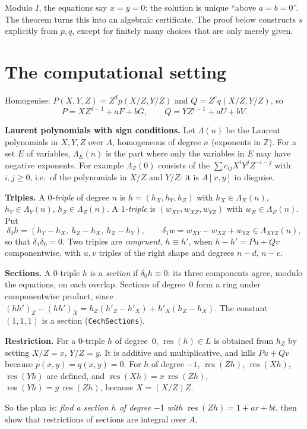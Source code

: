 \documentclass[11pt]{amsart}
\theoremstyle{definition}
\theoremstyle{remark}
\DeclareMathOperator{\res}{res}
\newcommand{\La}{\Lambda}
\begin{document}
Modulo $I$, the equations say $x=y=0$: the solution is unique ``above
$a=b=0$''. The theorem turns this into an algebraic certificate. The
proof below constructs $s$ explicitly from $p,q$, except for finitely
many choices that are only merely given.

\section{The computational setting}

Homogenise: $P(X,Y,Z)=Z^dp(X/Z,Y/Z)$ and $Q=Z^eq(X/Z,Y/Z)$, so
\[
 P=XZ^{d-1}+aF+bG,\qquad Q=YZ^{e-1}+aU+bV .
\]

\textbf{Laurent polynomials with sign conditions.} Let $\La(n)$ be the
Laurent polynomials in $X,Y,Z$ over $A$, homogeneous of degree $n$
(exponents in $\mathbb Z$). For a set $E$ of variables, $\La_E(n)$ is the
part where only the variables in $E$ may have negative exponents. For
example $\La_Z(0)$ consists of the
$\sum c_{ij}X^iY^jZ^{-i-j}$ with $i,j\ge0$, i.e.\ of the polynomials in
$X/Z$ and $Y/Z$: it is $A[x,y]$ in disguise.

\textbf{Triples.} A \emph{$0$-triple} of degree $n$ is
$h=(h_X,h_Y,h_Z)$ with $h_X\in\La_X(n)$, $h_Y\in\La_Y(n)$,
$h_Z\in\La_Z(n)$. A \emph{$1$-triple} is
$(w_{XY},w_{XZ},w_{YZ})$ with $w_E\in\La_E(n)$. Put
\[
 \delta_0h=(h_Y-h_X,\ h_Z-h_X,\ h_Z-h_Y),\qquad
 \delta_1w=w_{XY}-w_{XZ}+w_{YZ}\in\La_{XYZ}(n),
\]
so that $\delta_1\delta_0=0$. Two triples are \emph{congruent},
$h\equiv h'$, when $h-h'=Pu+Qv$ componentwise, with $u,v$ triples of the
right shape and degrees $n-d$, $n-e$.

\textbf{Sections.} A $0$-triple $h$ is a \emph{section} if
$\delta_0h\equiv0$: its three components agree, modulo the equations, on
each overlap. Sections of degree~$0$ form a ring under componentwise
product, since
$(hh')_Z-(hh')_X=h_Z(h'_Z-h'_X)+h'_X(h_Z-h_X)$. The constant $(1,1,1)$
is a section (\texttt{CechSections}).

\textbf{Restriction.} For a $0$-triple $h$ of degree~$0$, $\res(h)\in L$
is obtained from $h_Z$ by setting $X/Z=x$, $Y/Z=y$. It is additive and
multiplicative, and kills $Pu+Qv$ because $p(x,y)=q(x,y)=0$. For $h$ of
degree $-1$, $\res(Zh)$, $\res(Xh)$, $\res(Yh)$ are defined, and
$\res(Xh)=x\,\res(Zh)$, $\res(Yh)=y\,\res(Zh)$, because $X=(X/Z)Z$.

So the plan is: \emph{find a section $h$ of degree $-1$ with
$\res(Zh)=1+ar+bt$}, then show that restrictions of sections are
integral over $A$.
\end{document}
